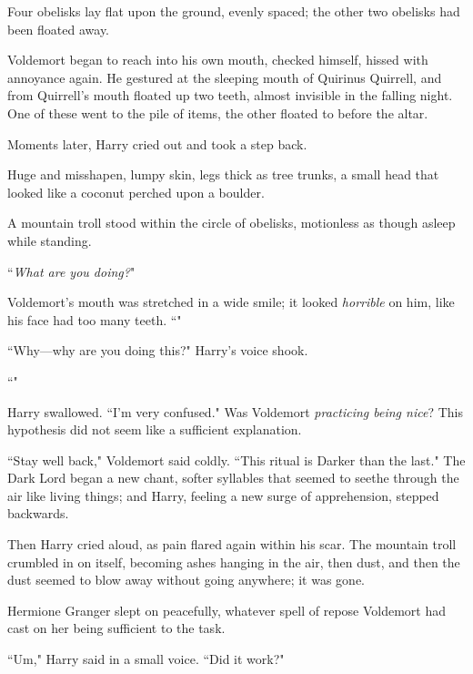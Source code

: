 Four obelisks lay flat upon the ground, evenly spaced; the other two obelisks had been floated away.

Voldemort began to reach into his own mouth, checked himself, hissed with annoyance again. He gestured at the sleeping mouth of Quirinus Quirrell, and from Quirrell's mouth floated up two teeth, almost invisible in the falling night. One of these went to the pile of items, the other floated to before the altar.

Moments later, Harry cried out and took a step back.

Huge and misshapen, lumpy skin, legs thick as tree trunks, a small head that looked like a coconut perched upon a boulder.

A mountain troll stood within the circle of obelisks, motionless as though asleep while standing.

``\emph{What are you doing?}"

Voldemort's mouth was stretched in a wide smile; it looked \emph{horrible} on him, like his face had too many teeth. ``"

``Why—why are you doing this?" Harry's voice shook.

``"

Harry swallowed. ``I'm very confused." Was Voldemort \emph{practicing being nice}? This hypothesis did not seem like a sufficient explanation.

``Stay well back," Voldemort said coldly. ``This ritual is Darker than the last." The Dark Lord began a new chant, softer syllables that seemed to seethe through the air like living things; and Harry, feeling a new surge of apprehension, stepped backwards.

Then Harry cried aloud, as pain flared again within his scar. The mountain troll crumbled in on itself, becoming ashes hanging in the air, then dust, and then the dust seemed to blow away without going anywhere; it was gone.

Hermione Granger slept on peacefully, whatever spell of repose Voldemort had cast on her being sufficient to the task.

``Um," Harry said in a small voice. ``Did it work?"

